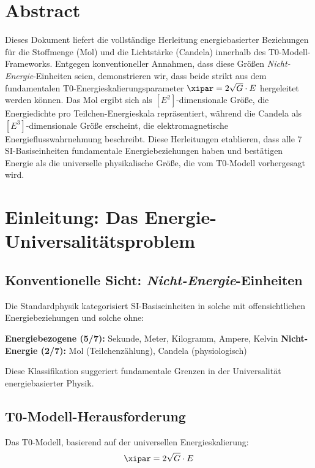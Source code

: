 \section*{Abstract}
		Dieses Dokument liefert die vollständige Herleitung energiebasierter Beziehungen für die Stoffmenge (Mol) und die Lichtstärke (Candela) innerhalb des T0-Modell-Frameworks. Entgegen konventioneller Annahmen, dass diese Größen \textit{Nicht-Energie}-Einheiten seien, demonstrieren wir, dass beide strikt aus dem fundamentalen T0-Energieskalierungsparameter $\xipar = 2\sqrt{G} \cdot E$ hergeleitet werden können. Das Mol ergibt sich als $[E^2]$-dimensionale Größe, die Energiedichte pro Teilchen-Energieskala repräsentiert, während die Candela als $[E^3]$-dimensionale Größe erscheint, die elektromagnetische Energieflusswahr\-nehmung beschreibt. Diese Herleitungen etablieren, dass alle 7 SI-Basiseinheiten fundamentale Energiebeziehungen haben und bestätigen Energie als die universelle physikalische Größe, die vom T0-Modell vorhergesagt wird.

	
	
	\section{Einleitung: Das Energie-Universalitätsproblem}
	\label{sec:einleitung}
	
	\subsection{Konventionelle Sicht: \textit{Nicht-Energie}-Einheiten}
	\label{subsec:konventionelle_sicht}
	
	Die Standardphysik kategorisiert SI-Basiseinheiten in solche mit offensichtlichen Energiebeziehungen und solche ohne:
	
	\textbf{Energiebezogene (5/7):} Sekunde, Meter, Kilogramm, Ampere, Kelvin
	\textbf{Nicht-Energie (2/7):} Mol (Teilchenzählung), Candela (physiologisch)
	
	Diese Klassifikation suggeriert fundamentale Grenzen in der Universalität energiebasierter Physik.
	
	\subsection{T0-Modell-Herausforderung}
	\label{subsec:t0_herausforderung}
	
	Das T0-Modell, basierend auf der universellen Energieskalierung:
	\begin{equation}
		\xipar = 2\sqrt{G} \cdot E
		\label{eq:t0_fundamental}
	\end{equation}
	
